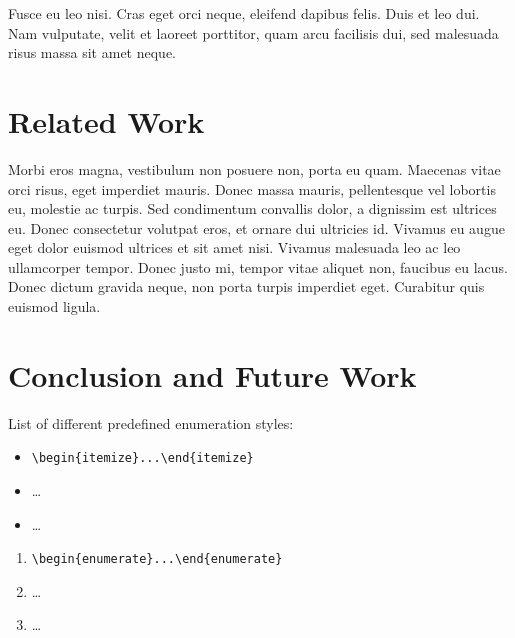 \documentclass[
  a4paper,
  oneside,         %
  UKenglish,       %
  cleveref,        %
  autoref,         %
  thm-restate      %
]{lipics-v2021}
\begin{document}
Fusce eu leo nisi. Cras eget orci neque, eleifend dapibus felis. Duis et leo dui. Nam vulputate, velit et laoreet porttitor, quam arcu facilisis dui, sed malesuada risus massa sit amet neque.

\section{Related Work}

Morbi eros magna, vestibulum non posuere non, porta eu quam. Maecenas vitae orci risus, eget imperdiet mauris. Donec massa mauris, pellentesque vel lobortis eu, molestie ac turpis. Sed condimentum convallis dolor, a dignissim est ultrices eu. Donec consectetur volutpat eros, et ornare dui ultricies id. Vivamus eu augue eget dolor euismod ultrices et sit amet nisi. Vivamus malesuada leo ac leo ullamcorper tempor. Donec justo mi, tempor vitae aliquet non, faucibus eu lacus. Donec dictum gravida neque, non porta turpis imperdiet eget. Curabitur quis euismod ligula. 






\appendix

\section{Conclusion and Future Work}\label{sec:itemStyles}

List of different predefined enumeration styles:

\begin{itemize}
\item \verb|\begin{itemize}...\end{itemize}|
\item \dots
\item \dots
\end{itemize}

\begin{enumerate}
\item \verb|\begin{enumerate}...\end{enumerate}|
\item \dots
\item \dots
\end{enumerate}
\end{document}
